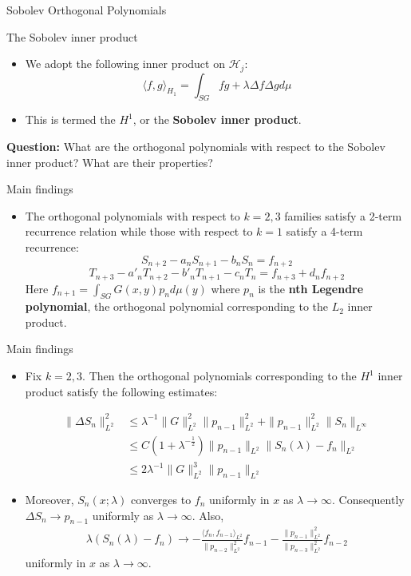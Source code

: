 \documentclass[xcolor = dvipsnames]{beamer}
\newcommand{\lap}{\Delta}
\begin{document}
\begin{section}{Sobolev Orthogonal Polynomials}
\begin{frame}{The Sobolev inner product}
    \begin{itemize}
        \item We adopt the following inner product on $\mathcal{H}_j$: 
        $$ \langle f,g \rangle_{H_1} = \int_{SG}fg + \lambda\Delta f \Delta g d\mu$$
        \item This is termed the $H^1$, or the \textbf{Sobolev inner product}.
    \end{itemize} 
    \pause
    \textbf{Question:} What are the orthogonal polynomials with respect to the Sobolev inner product? What are their properties?
\end{frame}

\begin{frame}{Main findings}
\begin{itemize}
    \item The orthogonal polynomials with respect to $k=2,3$ families satisfy a 2-term recurrence relation while those with respect to $k=1$ satisfy a 4-term recurrence: 
    $$S_{n+2} - a_nS_{n+1}-b_nS_n = f_{n+2}$$
    $$T_{n+3}-a'_nT_{n+2} - b'_nT_{n+1}-c_nT_n = f_{n+3}+d_nf_{n+2}$$
    Here $f_{n+1} = \int_{SG}G(x,y)p_{n}d\mu(y)$ where $p_{n}$ is the \textbf{nth Legendre polynomial}, the orthogonal polynomial corresponding to the $L_2$ inner product. 
\end{itemize}
\end{frame}

\begin{frame}{Main findings}
\begin{itemize}
    \item Fix $k=2,3$. Then the orthogonal polynomials corresponding to the $H^1$ inner product satisfy the following estimates: 
    
\begin{align*}
    \|\lap S_n\|_{L^2}^2&\le \lambda^{-1}\|G\|_{L^2}^2\|p_{n-1}\|_{L^2}^2+\|p_{n-1}\|_{L^2}^2 %
\|S_n\|_{L^{\infty}}\\
&\le C(1+\lambda^{-\frac12})\|p_{n-1}\|_{L^2} %
\|S_n(\lambda)-f_n\|_{L^2}\\
&\le 2\lambda^{-1}\|G\|_{L^2}^3\|p_{n-1}\|_{L^2}
\end{align*}

\pause
\item Moreover, $S_n(x;\lambda)$ converges to $f_n$ uniformly in $x$ as $\lambda\rightarrow\infty$. Consequently $\lap S_n\rightarrow p_{n-1}$ uniformly as $\lambda\rightarrow\infty$. Also, 
\begin{align*}
\lambda(S_n(\lambda)-f_n)\rightarrow-\frac{\langle f_n,f_{n-1}\rangle_{L^2}}{\|p_{n-2}\|_{L^2}^2}f_{n-1}-\frac{\|p_{n-1}\|_{L^2}^2}{\|p_{n-3}\|_{L^2}^2}f_{n-2} %
\end{align*}
uniformly in $x$ as $\lambda\rightarrow\infty$.
\end{itemize}
\end{frame}


\end{section}
\end{document}
